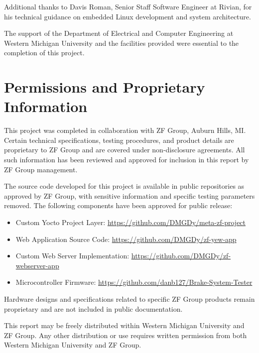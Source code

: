 \documentclass[12pt]{article}
\begin{document}
Additional thanks to Davis Roman, Senior Staff Software Engineer at Rivian, for his technical guidance on embedded Linux development and system architecture.

The support of the Department of Electrical and Computer Engineering at Western Michigan University and the facilities provided were essential to the completion of this project.

\section*{Permissions and Proprietary Information}

This project was completed in collaboration with ZF Group, Auburn Hills, MI. Certain technical specifications, testing procedures, and product details are proprietary to ZF Group and are covered under non-disclosure agreements. All such information has been reviewed and approved for inclusion in this report by ZF Group management.

The source code developed for this project is available in public repositories as approved by ZF Group, with sensitive information and specific testing parameters removed. The following components have been approved for public release:
\begin{itemize}
  \item Custom Yocto Project Layer: \url{https://github.com/DMGDy/meta-zf-project}
  \item Web Application Source Code: \url{https://github.com/DMGDy/zf-yew-app}
  \item Custom Web Server Implementation: \url{https://github.com/DMGDy/zf-webserver-app}
  \item Microcontroller Firmware: \url{https://github.com/danb127/Brake-System-Tester}
\end{itemize}

Hardware designs and specifications related to specific ZF Group products remain proprietary and are not included in public documentation.

This report may be freely distributed within Western Michigan University and ZF Group. Any other distribution or use requires written permission from both Western Michigan University and ZF Group.

\tableofcontents
\newpage

\end{document}
